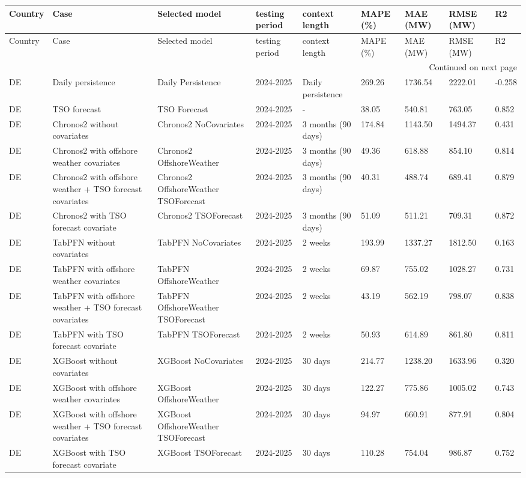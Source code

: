 \begin{longtable}{lllllllll}
\toprule
Country & Case & Selected model & testing period & context length & MAPE (\%) & MAE (MW) & RMSE (MW) & R2 \\
\midrule
\endfirsthead
\toprule
Country & Case & Selected model & testing period & context length & MAPE (\%) & MAE (MW) & RMSE (MW) & R2 \\
\midrule
\endhead
\midrule
\multicolumn{9}{r}{Continued on next page} \\
\midrule
\endfoot
\bottomrule
\endlastfoot
DE & Daily persistence & Daily Persistence & 2024-2025 & Daily persistence & 269.26 & 1736.54 & 2222.01 & -0.258 \\
DE & TSO forecast & TSO Forecast & 2024-2025 & - & 38.05 & 540.81 & 763.05 & 0.852 \\
DE & Chronos2 without covariates & Chronos2 NoCovariates & 2024-2025 & 3 months (90 days) & 174.84 & 1143.50 & 1494.37 & 0.431 \\
DE & Chronos2 with offshore weather covariates & Chronos2 OffshoreWeather & 2024-2025 & 3 months (90 days) & 49.36 & 618.88 & 854.10 & 0.814 \\
DE & Chronos2 with offshore weather + TSO forecast covariates & Chronos2 OffshoreWeather TSOForecast & 2024-2025 & 3 months (90 days) & 40.31 & 488.74 & 689.41 & 0.879 \\
DE & Chronos2 with TSO forecast covariate & Chronos2 TSOForecast & 2024-2025 & 3 months (90 days) & 51.09 & 511.21 & 709.31 & 0.872 \\
DE & TabPFN without covariates & TabPFN NoCovariates & 2024-2025 & 2 weeks & 193.99 & 1337.27 & 1812.50 & 0.163 \\
DE & TabPFN with offshore weather covariates & TabPFN OffshoreWeather & 2024-2025 & 2 weeks & 69.87 & 755.02 & 1028.27 & 0.731 \\
DE & TabPFN with offshore weather + TSO forecast covariates & TabPFN OffshoreWeather TSOForecast & 2024-2025 & 2 weeks & 43.19 & 562.19 & 798.07 & 0.838 \\
DE & TabPFN with TSO forecast covariate & TabPFN TSOForecast & 2024-2025 & 2 weeks & 50.93 & 614.89 & 861.80 & 0.811 \\
DE & XGBoost without covariates & XGBoost NoCovariates & 2024-2025 & 30 days & 214.77 & 1238.20 & 1633.96 & 0.320 \\
DE & XGBoost with offshore weather covariates & XGBoost OffshoreWeather & 2024-2025 & 30 days & 122.27 & 775.86 & 1005.02 & 0.743 \\
DE & XGBoost with offshore weather + TSO forecast covariates & XGBoost OffshoreWeather TSOForecast & 2024-2025 & 30 days & 94.97 & 660.91 & 877.91 & 0.804 \\
DE & XGBoost with TSO forecast covariate & XGBoost TSOForecast & 2024-2025 & 30 days & 110.28 & 754.04 & 986.87 & 0.752 \\
\end{longtable}
